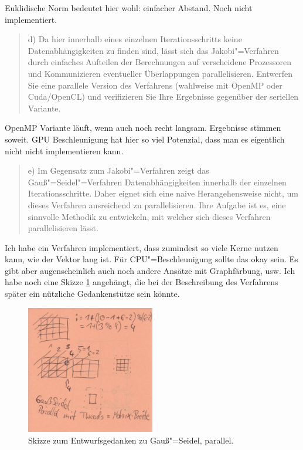 \documentclass[paper = a4]{scrartcl}
\begin{document}
Euklidische Norm bedeutet hier wohl: einfacher Abstand. Noch nicht implementiert.

\begin{quote}
    d) Da hier innerhalb eines einzelnen Iterationsschritts keine Datenabhängigkeiten zu finden sind, lässt sich das Jakobi"=Verfahren durch einfaches Aufteilen der Berechnungen auf verscheidene Prozessoren und Kommunizieren eventueller Überlappungen parallelisieren. Entwerfen Sie eine parallele Version des Verfahrens (wahlweise mit OpenMP oder Cuda/OpenCL) und verifizieren Sie Ihre Ergebnisse gegenüber der seriellen Variante.
\end{quote}

OpenMP Variante läuft, wenn auch noch recht langsam. Ergebnisse stimmen soweit. GPU Beschleunigung hat hier so viel Potenzial, dass man es eigentlich nicht nicht implementieren kann.

\begin{quote}
    e) Im Gegensatz zum Jakobi"=Verfahren zeigt das Gauß"=Seidel"=Verfahren Datenabhängigkeiten innerhalb der einzelnen Iterationsschritte. Daher eignet sich eine naive Herangehensweise nicht, um dieses Verfahren ausreichend zu parallelisieren. Ihre Aufgabe ist es, eine sinnvolle Methodik zu entwickeln, mit welcher sich dieses Verfahren parallelisieren lässt.
\end{quote}

Ich habe ein Verfahren implementiert, dass zumindest so viele Kerne nutzen kann, wie der Vektor lang ist. Für CPU"=Beschleunigung sollte das okay sein. Es gibt aber augenscheinlich auch noch andere Ansätze mit Graphfärbung, usw. Ich habe noch eine Skizze \ref{fig:gaussseidelskizze} angehängt, die bei der Beschreibung des Verfahrens später ein nützliche Gedankenstütze sein könnte.

\begin{figure}
    \centering
    \includegraphics[width=0.5\textwidth]{gaussseidelskizze}
    \caption{Skizze zum Entwurfsgedanken zu Gauß"=Seidel, parallel.}
    \label{fig:gaussseidelskizze}
\end{figure}
\end{document}
